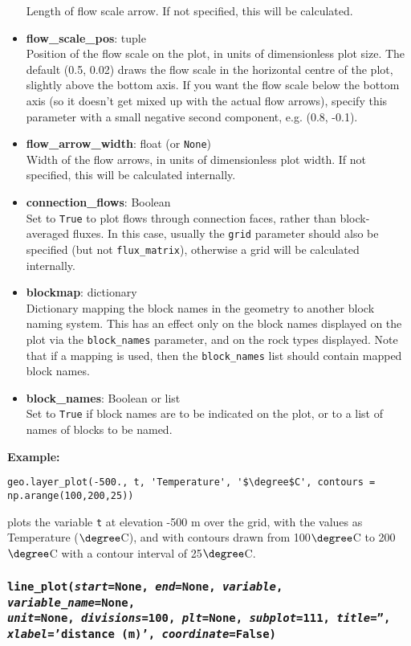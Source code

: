 \begin{itemize}
  Length of flow scale arrow.  If not specified, this will be calculated.
\item \textbf{flow\_scale\_pos}: tuple\\
  Position of the flow scale on the plot, in units of dimensionless plot size.  The default (0.5, 0.02) draws the flow scale in the horizontal centre of the plot, slightly above the bottom axis.  If you want the flow scale below the bottom axis (so it doesn't get mixed up with the actual flow arrows), specify this parameter with a small negative second component, e.g. (0.8, -0.1).
\item \textbf{flow\_arrow\_width}: float (or \texttt{None})\\
  Width of the flow arrows, in units of dimensionless plot width.  If not specified, this will be calculated internally.
\item \textbf{connection\_flows}: Boolean\\
  Set to \texttt{True} to plot flows through connection faces, rather than block-averaged fluxes.  In this case, usually the \texttt{grid} parameter should also be specified (but not \texttt{flux\_matrix}), otherwise a grid will be calculated internally.
\item \textbf{blockmap}: dictionary\\
  Dictionary mapping the block names in the geometry to another block naming system. This has an effect only on the block names displayed on the plot via the \texttt{block\_names} parameter, and on the rock types displayed. Note that if a mapping is used, then the \texttt{block\_names} list should contain mapped block names.
\item \textbf{block\_names}: Boolean or list\\
  Set to \texttt{True} if block names are to be indicated on the plot, or to a list of names of blocks to be named.
\end{itemize}

\textbf{Example:}

\begin{lstlisting}
geo.layer_plot(-500., t, 'Temperature', '$\degree$C', contours = np.arange(100,200,25))
\end{lstlisting}

plots the variable \texttt{t} at elevation -500 m over the grid, with the values as Temperature ($\degree$C), and with contours drawn from 100$\degree$C to 200$\degree$C with a contour interval of 25$\degree$C.

\begin{snugshade}
\subsubsection{\texttt{line\_plot(\emph{start}=None, \emph{end}=None, \emph{variable}, \emph{variable\_name}=None,\\
\emph{unit}=None, \emph{divisions}=100, \emph{plt}=None, \emph{subplot}=111, \emph{title}='',\\
\emph{xlabel}='distance (m)', \emph{coordinate}=\texttt{False})}}\end{snugshade}
\label{sec:mulgrid:line_plot}

